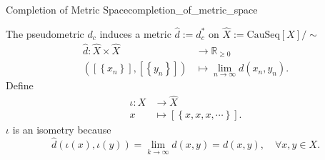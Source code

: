 \documentclass{report}
\begin{document}
\begin{definition}{Completion of Metric Space}{completion_of_metric_space}
\begin{enumerate}[(i)]
	\end{enumerate}
	The pseudometric $d_c$ induces a metric $\hat{d}:=d_c^*$ on $\widehat{X}:=\mathrm{CauSeq}[X]/\sim$
	\begin{align*}
		\hat{d}:\widehat{X}\times\widehat{X}                   & \longrightarrow\mathbb{R}_{\ge 0}       \\
		\left([\left\{x_n\right\}],[\left\{y_n\right\}]\right) & \longmapsto\lim_{n\to\infty}d(x_n,y_n).
	\end{align*}
	Define
	\begin{align*}
		\iota:X & \longrightarrow\widehat{X}                \\
		x       & \longmapsto[\left\{x,x,x,\cdots\right\}].
	\end{align*}
	$\iota$ is an isometry because
	\[
		\hat{d}\left(\iota\left(x\right),\iota\left(y\right)\right)=\lim_{k\to\infty}d(x,y)=d(x,y),\quad\forall x,y\in X.
	\]
\end{definition}
\end{document}
